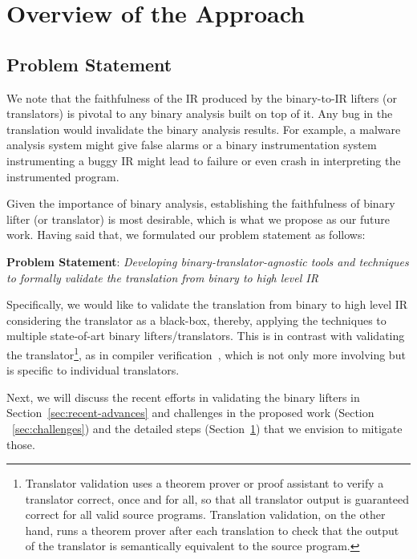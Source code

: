 \chapter{Overview of the Approach}\label{sec:approach}
\section{Problem Statement}\label{sec:statement}

We note that the faithfulness of the IR produced by the binary-to-IR lifters
(or translators) is pivotal to any binary analysis built on top of it.  Any bug
in the translation would invalidate the binary analysis results. For example, a
malware analysis system might give false alarms or a binary instrumentation
system instrumenting a buggy IR might lead to failure or even crash in
interpreting the instrumented program.

Given the importance of binary analysis, establishing the faithfulness of
binary lifter (or translator) is most desirable, which is what we propose as
our future work. Having said that, we formulated our problem statement as follows:

\vspace{10pt}

\noindent\textbf{Problem Statement}: \emph{Developing
  binary-translator-agnostic tools and techniques to formally validate the
    translation from binary to high level IR}

Specifically, we would like to validate the translation from binary to high
level IR considering the translator as a black-box, thereby, applying the
techniques to multiple state-of-art binary lifters/translators. This is
in contrast with  validating the translator\footnote{Translator validation uses a
  theorem prover or proof assistant to verify a translator correct, once and
    for all, so that all translator output is guaranteed correct for all valid
      source programs. Translation validation, on the other hand, runs a
        theorem prover after each translation to check that the output of the
        translator is semantically equivalent to the source program.}, as
         in  compiler verification~\cite{Leroy:2009}, which
        is not only more involving but is specific to individual
        translators.

Next, we will discuss the recent efforts in validating the binary lifters in
Section~\ref{sec:recent-advances} and challenges in the proposed work (Section
    ~\ref{sec:challenges}) and the detailed steps (Section~\ref{sec:approach})
that we envision to mitigate those.

